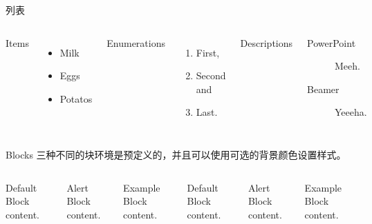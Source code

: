 \documentclass[8pt,UTF8]{ctexbeamer}
\begin{document}
\begin{frame}{列表}
  \begin{columns}[T,onlytextwidth]
      Items
      \begin{itemize}
        \item Milk 
        \item Eggs 
        \item Potatos
      \end{itemize}

      Enumerations
      \begin{enumerate}
        \item First, 
        \item Second and 
        \item Last.
      \end{enumerate}

      Descriptions
      \begin{description}
        \item[PowerPoint] Meeh. 
        \item[Beamer] Yeeeha.
      \end{description}
  \end{columns}
\end{frame}

\begin{frame}{Blocks}
  三种不同的块环境是预定义的，并且可以使用可选的背景颜色设置样式。

  \begin{columns}[T,onlytextwidth]
      \begin{block}{Default}
        Block content.
      \end{block}

      \begin{alertblock}{Alert}
        Block content.
      \end{alertblock}

      \begin{exampleblock}{Example}
        Block content.
      \end{exampleblock}



      \begin{block}{Default}
        Block content.
      \end{block}

      \begin{alertblock}{Alert}
        Block content.
      \end{alertblock}

      \begin{exampleblock}{Example}
        Block content.
      \end{exampleblock}

  \end{columns}
\end{frame}
\end{document}
